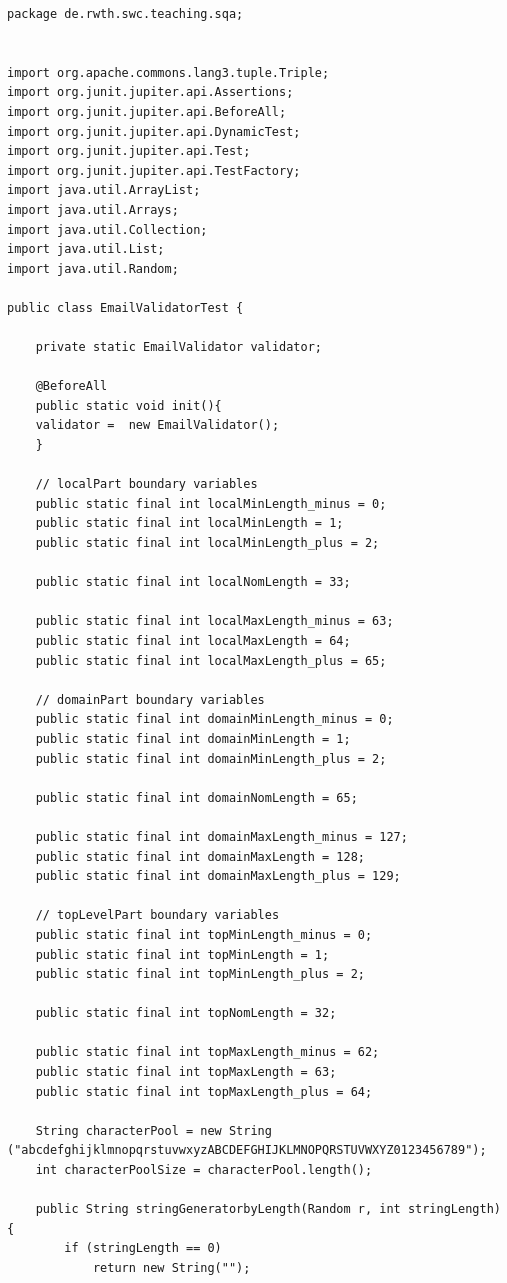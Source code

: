 \documentclass[a4paper,9pt,oneside]{scrreprt}
\begin{document}
\begin{lstlisting}
package de.rwth.swc.teaching.sqa;


import org.apache.commons.lang3.tuple.Triple;
import org.junit.jupiter.api.Assertions;
import org.junit.jupiter.api.BeforeAll;
import org.junit.jupiter.api.DynamicTest;
import org.junit.jupiter.api.Test;
import org.junit.jupiter.api.TestFactory;
import java.util.ArrayList;
import java.util.Arrays;
import java.util.Collection;
import java.util.List;
import java.util.Random;

public class EmailValidatorTest {

	private static EmailValidator validator;
	
	@BeforeAll
	public static void init(){
	validator =  new EmailValidator();
	}
	
	// localPart boundary variables
	public static final int localMinLength_minus = 0;
	public static final int localMinLength = 1;
	public static final int localMinLength_plus = 2;
	
	public static final int localNomLength = 33;
	
	public static final int localMaxLength_minus = 63;
	public static final int localMaxLength = 64;
	public static final int localMaxLength_plus = 65;
	
	// domainPart boundary variables
	public static final int domainMinLength_minus = 0;
	public static final int domainMinLength = 1;
	public static final int domainMinLength_plus = 2;
	
	public static final int domainNomLength = 65;
	
	public static final int domainMaxLength_minus = 127;
	public static final int domainMaxLength = 128;
	public static final int domainMaxLength_plus = 129;
	
	// topLevelPart boundary variables
	public static final int topMinLength_minus = 0;
	public static final int topMinLength = 1;
	public static final int topMinLength_plus = 2;
	
	public static final int topNomLength = 32;
	
	public static final int topMaxLength_minus = 62;
	public static final int topMaxLength = 63;
	public static final int topMaxLength_plus = 64;
	
	String characterPool = new String ("abcdefghijklmnopqrstuvwxyzABCDEFGHIJKLMNOPQRSTUVWXYZ0123456789");
	int characterPoolSize = characterPool.length();
	
	public String stringGeneratorbyLength(Random r, int stringLength) {
		if (stringLength == 0)
			return new String("");
	

\end{lstlisting}
\end{document}
